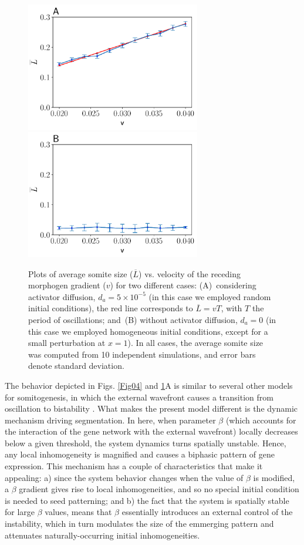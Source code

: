 \documentclass[%
 preprint,
 aip, 
 amsmath,amssymb,
]{revtex4-2}
\begin{document}
\begin{figure}
	\centering
	\includegraphics[width=3in]{Fig05a} 
	\includegraphics[width=3in]{Fig05b}
	\caption{Plots of average somite size ($\overline{L}$) vs. velocity of the receding morphogen gradient ($v$) for two different cases: (A)~considering activator diffusion, $d_a = 5\times10^{-5}$ (in this case we employed random initial conditions), the red line corresponds to $\overline{L} = v T$, with $T$ the period of oscillations; and~(B) without activator diffusion, $d_a = 0$ (in this case we employed homogeneous initial conditions, except for a small perturbation at $x=1$). In all cases, the average somite size was computed from 10 independent simulations, and error bars denote standard deviation.}
	\label{Fig04_1}
\end{figure}

The behavior depicted in Figs. \ref{Fig04} and \ref{Fig04_1}A is similar to several other models for somitogenesis, in which the external wavefront causes a transition from oscillation to bistability \cite{Francois2007}. What makes the present model different is the dynamic mechanism driving segmentation. In here, when parameter $\beta$ (which accounts for the interaction of the gene network with the external wavefront) locally decreases below a given threshold, the system dynamics turns spatially unstable. Hence, any local inhomogeneity is magnified and causes a biphasic pattern of gene expression. This mechanism has a couple of characteristics that make it appealing: a) since the system behavior changes when the value of $\beta$ is modified, a $\beta$ gradient gives rise to local inhomogeneities, and so no special initial condition is needed to seed patterning; and b) the fact that the system is spatially stable for large $\beta$ values, means that $\beta$ essentially introduces an external control of the instability, which in turn modulates the size of the emmerging pattern and attenuates naturally-occurring initial inhomogeneities.
	
\end{document}

